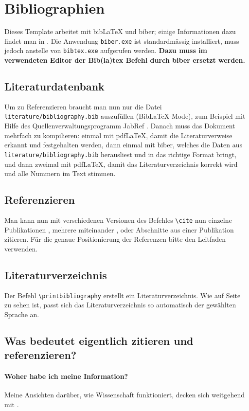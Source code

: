 \section{Bibliographien}
Dieses Template arbeitet mit bibLaTeX und biber; einige Informationen dazu findet man in \cite{biblatex_biber}. Die Anwendung \texttt{biber.exe} ist standardmässig installiert, muss jedoch anstelle von \texttt{bibtex.exe} aufgerufen werden. \textbf{Dazu muss im verwendeten Editor der Bib(la)tex Befehl durch biber ersetzt werden.} 


\subsection{Literaturdatenbank}
Um zu Referenzieren braucht man nun nur die Datei \verb|literature/bibliography.bib| auszufüllen (BibLaTeX-Mode), zum Beispiel mit Hilfe des Quellenverwaltungsprogramm JabRef \cite{jabref}. Danach muss das Dokument mehrfach zu kompilieren: einmal mit pdfLaTeX, damit die Literaturverweise erkannt und festgehalten werden, dann einmal mit biber, welches die Daten aus \verb|literature/bibliography.bib| herausliest und in das richtige Format bringt, und dann zweimal mit pdfLaTeX, damit das Literaturverzeichnis korrekt wird und alle Nummern im Text stimmen.

\subsection{Referenzieren}
Man kann nun mit verschiedenen Versionen des Befehles \verb|\cite| nun einzelne Publikationen \cite{Mason1953}, mehrere miteinander \cite{Mason1953,Mason1956}, oder Abschnitte aus einer Publikation \cite[Sec.~4]{Schmid2018} zitieren.
Für die genaue Positionierung der Referenzen bitte den Leitfaden verwenden.

\subsection{Literaturverzeichnis}
Der Befehl \verb|\printbibliography| erstellt ein Literaturverzeichnis.
Wie auf Seite~\pageref{sec:lit} zu sehen ist, passt sich das Literaturverzeichnis so automatisch der gewählten Sprache an.

\subsection{Was bedeutet eigentlich zitieren und referenzieren?}

\paragraph{Woher habe ich meine Information?}
Meine Ansichten darüber, wie Wissenschaft funktioniert, decken sich weitgehend mit \cite{Schmid2003}.

